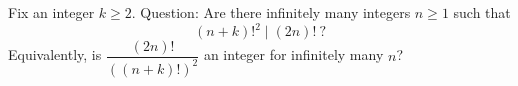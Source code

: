 Fix an integer $k\ge 2$.
Question: Are there infinitely many integers $n\ge 1$ such that
\[
(n+k)!^2 \mid (2n)!\ ?
\]
Equivalently, is $\dfrac{(2n)!}{((n+k)!)^2}$ an integer for infinitely many $n$?
